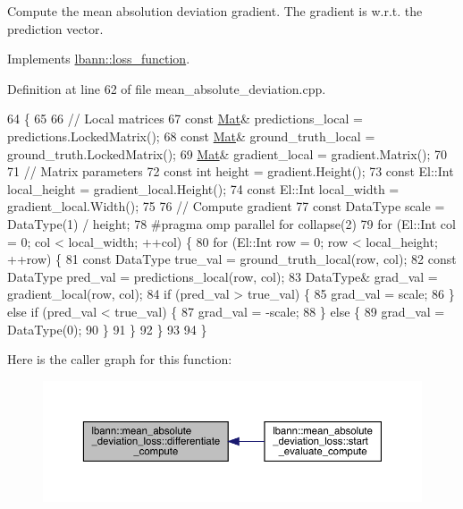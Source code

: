 Compute the mean absolution deviation gradient. The gradient is w.\+r.\+t. the prediction vector. 

Implements \hyperlink{classlbann_1_1loss__function_aefccc2b4f5a02664002d12630cf369e7}{lbann\+::loss\+\_\+function}.



Definition at line 62 of file mean\+\_\+absolute\+\_\+deviation.\+cpp.


\begin{DoxyCode}
64                                                                                \{
65 
66   \textcolor{comment}{// Local matrices}
67   \textcolor{keyword}{const} \hyperlink{base_8hpp_a68f11fdc31b62516cb310831bbe54d73}{Mat}& predictions\_local = predictions.LockedMatrix();
68   \textcolor{keyword}{const} \hyperlink{base_8hpp_a68f11fdc31b62516cb310831bbe54d73}{Mat}& ground\_truth\_local = ground\_truth.LockedMatrix();
69   \hyperlink{base_8hpp_a68f11fdc31b62516cb310831bbe54d73}{Mat}& gradient\_local = gradient.Matrix();
70 
71   \textcolor{comment}{// Matrix parameters}
72   \textcolor{keyword}{const} \textcolor{keywordtype}{int} height = gradient.Height();
73   \textcolor{keyword}{const} El::Int local\_height = gradient\_local.Height();
74   \textcolor{keyword}{const} El::Int local\_width = gradient\_local.Width();
75 
76   \textcolor{comment}{// Compute gradient}
77   \textcolor{keyword}{const} DataType scale = DataType(1) / height;
78 \textcolor{preprocessor}{  #pragma omp parallel for collapse(2)}
79   \textcolor{keywordflow}{for} (El::Int col = 0; col < local\_width; ++col) \{
80     \textcolor{keywordflow}{for} (El::Int row = 0; row < local\_height; ++row) \{
81       \textcolor{keyword}{const} DataType true\_val = ground\_truth\_local(row, col);
82       \textcolor{keyword}{const} DataType pred\_val = predictions\_local(row, col);
83       DataType& grad\_val = gradient\_local(row, col);
84       \textcolor{keywordflow}{if} (pred\_val > true\_val) \{
85         grad\_val = scale;
86       \} \textcolor{keywordflow}{else} \textcolor{keywordflow}{if} (pred\_val < true\_val) \{
87         grad\_val = -scale;
88       \} \textcolor{keywordflow}{else} \{
89         grad\_val = DataType(0);
90       \}
91     \}
92   \}
93 
94 \}
\end{DoxyCode}
Here is the caller graph for this function\+:\nopagebreak
\begin{figure}[H]
\begin{center}
\leavevmode
\includegraphics[width=350pt]{classlbann_1_1mean__absolute__deviation__loss_a3ed0cbe4e405c10bf3f6a80eb693390e_icgraph}
\end{center}
\end{figure}
